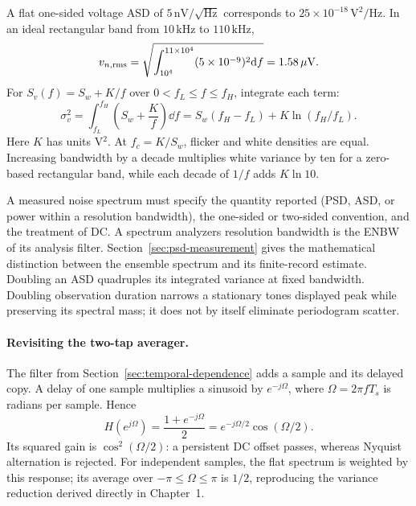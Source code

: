 \begin{example}[title={Noise integration from amplitude spectral density}]
A flat one-sided voltage ASD of $5\,\mathrm{nV}/\sqrt{\mathrm{Hz}}$ corresponds to $25\times10^{-18}\,\mathrm{V^2/Hz}$. In an ideal rectangular band from $10\,\mathrm{kHz}$ to $110\,\mathrm{kHz}$,
\[
v_{n,\mathrm{rms}}=\sqrt{\int_{10^4}^{11\times10^4} (5\times10^{-9})^2\mathrm d f}
=1.58\,\mu\mathrm V.
\]
For $S_v(f)=S_w+K/f$ over $0<f_L\leq f\leq f_H$, integrate each term:
\[
\sigma_v^2=\int_{f_L}^{f_H}\left(S_w+\frac Kf\right)\dd f
=S_w(f_H-f_L)+K\ln(f_H/f_L).
\]
Here $K$ has units V$^2$.
At $f_c=K/S_w$, flicker and white densities are equal. Increasing bandwidth by a decade multiplies white variance by ten for a zero-based rectangular band, while each decade of $1/f$ adds $K\ln 10$.
\end{example}
A measured noise spectrum must specify the quantity reported (PSD, ASD, or power within a resolution bandwidth), the one-sided or two-sided convention, and the treatment of DC. A spectrum analyzer\textquotesingle s resolution bandwidth is the ENBW of its analysis filter. Section~\ref{sec:psd-measurement} gives the mathematical distinction between the ensemble spectrum and its finite-record estimate.
Doubling an ASD quadruples its integrated variance at fixed bandwidth. Doubling observation duration narrows a stationary tone\textquotesingle s displayed peak while preserving its spectral mass; it does not by itself eliminate periodogram scatter.

\paragraph{Revisiting the two-tap averager.}
\label{sec:two-tap-spectrum}
The filter from Section~\ref{sec:temporal-dependence} adds a sample and its delayed copy. A delay of one sample multiplies a sinusoid by $e^{-j\Omega}$, where $\Omega=2\pi fT_s$ is radians per sample. Hence
\[
H(e^{j\Omega})=\frac{1+e^{-j\Omega}}2
=e^{-j\Omega/2}\cos(\Omega/2).
\]
Its squared gain is $\cos^2(\Omega/2)$: a persistent DC offset passes, whereas Nyquist alternation is rejected. For independent samples, the flat spectrum is weighted by this response; its average over $-\pi\leq\Omega\leq\pi$ is $1/2$, reproducing the variance reduction derived directly in Chapter~1.
\FIRFigure
